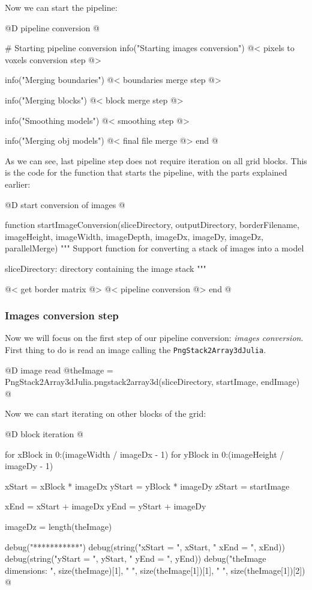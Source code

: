 \documentclass[11pt,oneside]{article}	%
\begin{document}
Now we can start the pipeline:

@D pipeline conversion
@{# Starting pipeline conversion
info("Starting images conversion")
@< pixels to voxels conversion step @>

info("Merging boundaries")
@< boundaries merge step @>
		
info("Merging blocks")
@< block merge step @>

info("Smoothing models")
@< smoothing step @>

info("Merging obj models")
@< final file merge @>
end @}

As we can see, last pipeline step does not require iteration on all grid blocks. This is the code for the function that starts the pipeline, with the parts explained earlier: 

@D start conversion of images
@{function startImageConversion(sliceDirectory, outputDirectory, borderFilename,
                              imageHeight, imageWidth, imageDepth,
                              imageDx, imageDy, imageDz,
                              parallelMerge)
  """
  Support function for converting a stack of images into a model

  sliceDirectory: directory containing the image stack
  """

  @< get border matrix @>
  @< pipeline conversion @>  
end
@}

\subsubsection{Images conversion step}\label{sec:conversionProcess}

Now we will focus on the first step of our pipeline conversion: \textit{images conversion}.\\
First thing to do is read an image calling the \texttt{PngStack2Array3dJulia}.

@D image read
@{theImage = PngStack2Array3dJulia.pngstack2array3d(sliceDirectory,
						startImage, endImage)
@}

Now we can start iterating on other blocks of the grid:

@D block iteration
@{for xBlock in 0:(imageWidth / imageDx - 1)
  for yBlock in 0:(imageHeight / imageDy - 1)
  
    xStart = xBlock * imageDx
    yStart = yBlock * imageDy
    zStart = startImage
    
    xEnd = xStart + imageDx
    yEnd = yStart + imageDy
  
    imageDz = length(theImage)
  
    debug("***********")
    debug(string("xStart = ", xStart, " xEnd = ", xEnd))
    debug(string("yStart = ", yStart, " yEnd = ", yEnd))
    debug("theImage dimensions: ", size(theImage)[1], " ",
	  size(theImage[1])[1], " ", size(theImage[1])[2]) @}
\end{document}
